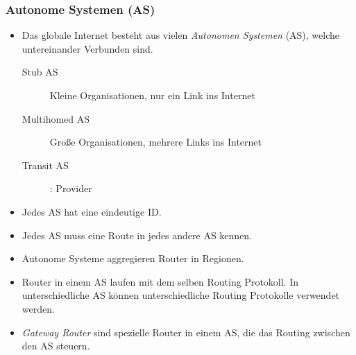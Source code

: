             \subsubsection{Autonome Systemen (AS)}
                \begin{itemize}
                	\item Das globale Internet besteht aus vielen \textit{Autonomen Systemen} (AS), welche untereinander Verbunden sind.
                    	\begin{description}
                    		\item[Stub AS] Kleine Organisationen, nur ein Link ins Internet
                    		\item[Multihomed AS] Große Organisationen, mehrere Links ins Internet
                    		\item[Transit AS]: Provider
                    	\end{description}
                    \item Jedes AS hat eine eindeutige ID.
                    \item Jedes AS muss eine Route in jedes andere AS kennen.
                    \item Autonome Systeme aggregieren Router in Regionen.
                    \item Router in einem AS laufen mit dem selben Routing Protokoll. In unterschiedliche AS können unterschiedliche Routing Protokolle verwendet werden.
                    \item \textit{Gateway Router} sind spezielle Router in einem AS, die das Routing zwischen den AS steuern.
                \end{itemize}

